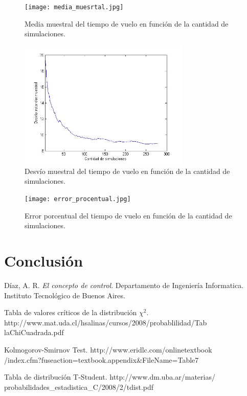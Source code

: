 \documentclass[10pt,journal,compsoc]{IEEEtran}
\begin{document}
\begin{figure}[t]
\label{fig:3d}
\begin{center}
\centering
\texttt{[image: media\_muesrtal.jpg]}
\caption{Media muestral del tiempo de vuelo en funci\'on de la cantidad de simulaciones.}
\end{center}
\end{figure}


\begin{figure}[t]
\label{fig:3d}
\begin{center}
\centering
\includegraphics[width=3.2in]{desvio.jpg}
\caption{Desv\'io muestral del tiempo de vuelo en funci\'on de la cantidad de simulaciones.}
\end{center}
\end{figure}



\begin{figure}[t]
\label{fig:3d}
\begin{center}
\centering
\texttt{[image: error\_procentual.jpg]}
\caption{Error porcentual del tiempo de vuelo en funci\'on de la cantidad de simulaciones.}
\end{center}
\end{figure}






\section{Conclusi\'on}






\begin{thebibliography}{1}

D\'iaz, A. R. \emph{El concepto de control}. Departamento de Ingenier\'ia Informatica. 
Instituto Tecnol\'ogico de Buenos Aires.


Tabla de valores cr\'iticos de la distribuci\'on $\chi^2$. http://www.mat.uda.cl/hsalinas/cursos/2008/probablilidad/Tab\\laChiCuadrada.pdf

Kolmogorov-Smirnov Test. http://www.eridlc.com/onlinetextbook\\/index.cfm?fuseaction=textbook.appendix\&FileName=Table7

Tabla de distribuci\'on T-Student. http://www.dm.uba.ar/materias/\\probabilidades\_estadistica\_C/2008/2/tdist.pdf

\end{thebibliography}
\end{document}

